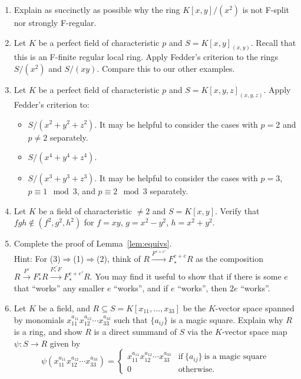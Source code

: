 \documentclass[12pt]{amsart}
\theoremstyle{definition}
\numberwithin{equation}{theorem}
\def\to{\longrightarrow}
\begin{document}
\begin{enumerate}
\item Explain as succinctly as possible why the ring $K[x,y]/(x^2)$ is not F-split nor strongly F-regular.
\item Let $K$ be a perfect field of characteristic $p$ and $S=K[x,y]_{(x,y)}$. Recall that this is an F-finite regular local ring. Apply Fedder's criterion to the rings $S/(x^2)$ and $S/(xy)$. Compare this to our other examples.
\item\label{ex:Fed} Let $K$ be a perfect field of characteristic $p$ and $S=K[x,y,z]_{(x,y,z)}$. Apply Fedder's criterion to:
\begin{itemize}
\item $S/(x^2+y^2+z^2)$. It may be helpful to consider the cases with $p=2$ and $p\neq 2$ separately.
\item $S/(x^4+y^4+z^4)$.
\item $S/(x^3+y^3+z^3)$. It may be helpful to consider the cases with $p=3$, $p \equiv 1 \mod 3$, and $p \equiv 2 \mod 3$ separately.
\end{itemize}

\item Let $K$ be a field of characteristic $\neq 2$ and $S=K[x,y]$. Verify that $fgh\notin (f^2,g^2,h^2)$ for $f=xy$, $g=x^2-y^2$, $h=x^2+y^2$.


\item Complete the proof of Lemma~\ref{lem:equivs}. \\Hint: For (3)$\Rightarrow$(1)$\Rightarrow$(2), think of $R \xrightarrow{F^{e+e'}} F^{e+e}_*R$ as the composition ${R \xrightarrow{F^e} F^e_*R \xrightarrow{F^{e'}_*F} F^{e+e'}_* R}$. You may find it useful to show that if there is some $e$ that ``works'' any smaller $e$ ``works'', and if $e$ ``works'', then $2e$ ``works''.

\item Let $K$ be a field, and $R\subseteq S=K[x_{11},\dots,x_{33}]$ be the $K$-vector space spanned by monomials $x_{11}^{a_{11}} x_{12}^{a_{12}} \cdots x_{33}^{a_{33}}$ such that $\{a_{ij}\}$ is a magic square. Explain why $R$ is a ring, and show $R$ is a direct summand of $S$ via the $K$-vector space map $\psi:S\to R$ given by
\[ \psi( x_{11}^{a_{11}} x_{12}^{a_{12}} \cdots x_{33}^{a_{33}}) = \begin{cases} x_{11}^{a_{11}} x_{12}^{a_{12}} \cdots x_{33}^{a_{33}} & \text{if} \ \{a_{ij}\} \ \text{is a magic square} \\ 0 & \text{otherwise}. \end{cases}\]



\end{enumerate}
\end{document}
